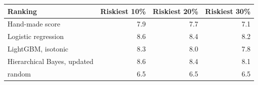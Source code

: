 \begin{tabular}{lrrr}
\toprule
Ranking & Riskiest 10\% & Riskiest 20\% & Riskiest 30\% \\
\midrule
Hand-made score & 7.9 & 7.7 & 7.1 \\
Logistic regression & 8.6 & 8.4 & 8.2 \\
LightGBM, isotonic & 8.3 & 8.0 & 7.8 \\
Hierarchical Bayes, updated & 8.6 & 8.4 & 8.1 \\
random & 6.5 & 6.5 & 6.5 \\
\bottomrule
\end{tabular}
